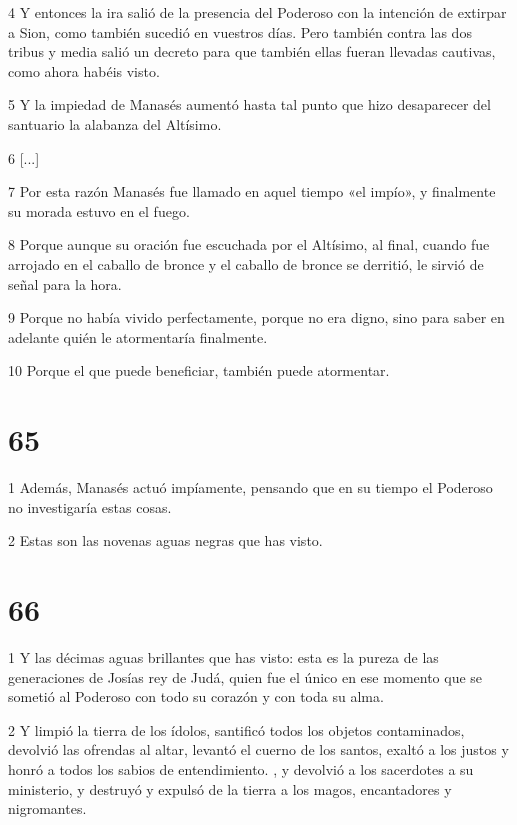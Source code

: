 \par 4 Y entonces la ira salió de la presencia del Poderoso con la intención de extirpar a Sion, como también sucedió en vuestros días. Pero también contra las dos tribus y media salió un decreto para que también ellas fueran llevadas cautivas, como ahora habéis visto.

\par 5 Y la impiedad de Manasés aumentó hasta tal punto que hizo desaparecer del santuario la alabanza del Altísimo.

\par 6 [...]

\par 7 Por esta razón Manasés fue llamado en aquel tiempo «el impío», y finalmente su morada estuvo en el fuego.

\par 8 Porque aunque su oración fue escuchada por el Altísimo, al final, cuando fue arrojado en el caballo de bronce y el caballo de bronce se derritió, le sirvió de señal para la hora.

\par 9 Porque no había vivido perfectamente, porque no era digno, sino para saber en adelante quién le atormentaría finalmente.

\par 10 Porque el que puede beneficiar, también puede atormentar.

\chapter{65}

\par 1 Además, Manasés actuó impíamente, pensando que en su tiempo el Poderoso no investigaría estas cosas.

\par 2 Estas son las novenas aguas negras que has visto.

\chapter{66}

\par 1 Y las décimas aguas brillantes que has visto: esta es la pureza de las generaciones de Josías rey de Judá, quien fue el único en ese momento que se sometió al Poderoso con todo su corazón y con toda su alma.

\par 2 Y limpió la tierra de los ídolos, santificó todos los objetos contaminados, devolvió las ofrendas al altar, levantó el cuerno de los santos, exaltó a los justos y honró a todos los sabios de entendimiento. , y devolvió a los sacerdotes a su ministerio, y destruyó y expulsó de la tierra a los magos, encantadores y nigromantes.

